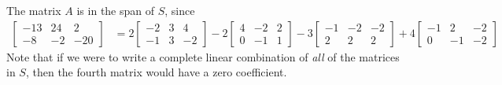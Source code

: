 The matrix $A$ is in the span of $S$, since
\begin{align*}
\begin{bmatrix} -13 & 24 & 2 \\ -8 & -2 & -20 \end{bmatrix}
&=
2\begin{bmatrix} -2 & 3 & 4 \\ -1 & 3 & -2 \end{bmatrix}
-2\begin{bmatrix} 4 & -2 & 2 \\ 0 & -1 & 1 \end{bmatrix}
-3\begin{bmatrix} -1 & -2 & -2 \\ 2 & 2 & 2 \end{bmatrix}
+ 4\begin{bmatrix} -1 & 2 & -2 \\0 & -1 & -2 \end{bmatrix}
\end{align*}
Note that if we were to write a complete linear combination of \emph{all} of the matrices in $S$, then the fourth matrix would have a zero coefficient.